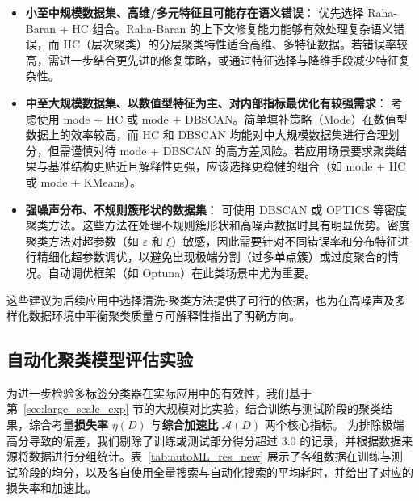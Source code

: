 \documentclass[10pt]{article} %
\numberwithin{equation}{section}
\begin{document}
\begin{itemize}
    \item \textbf{小至中规模数据集、高维/多元特征且可能存在语义错误}：
    优先选择 Raha-Baran + HC 组合。Raha-Baran 的上下文修复能力能够有效处理复杂语义错误，而 HC（层次聚类）的分层聚类特性适合高维、多特征数据。若错误率较高，需进一步结合更先进的修复策略，或通过特征选择与降维手段减少特征复杂性。

    \item \textbf{中至大规模数据集、以数值型特征为主、对内部指标最优化有较强需求}：
    考虑使用 mode + HC 或 mode + DBSCAN。简单填补策略（Mode）在数值型数据上的效率较高，而 HC 和 DBSCAN 均能对中大规模数据集进行合理划分，但需谨慎对待 mode + DBSCAN 的高方差风险。若应用场景要求聚类结果与基准结构更贴近且解释性更强，应该选择更稳健的组合（如 mode + HC 或 mode + KMeans）。

    \item \textbf{强噪声分布、不规则簇形状的数据集}：
    可使用 DBSCAN 或 OPTICS 等密度聚类方法。这些方法在处理不规则簇形状和高噪声数据时具有明显优势。密度聚类方法对超参数（如 $\varepsilon$ 和 $\xi$）敏感，因此需要针对不同错误率和分布特征进行精细化超参数调优，以避免出现极端分割（过多单点簇）或过度聚合的情况。自动调优框架（如 Optuna）在此类场景中尤为重要。
\end{itemize}

这些建议为后续应用中选择清洗-聚类方法提供了可行的依据，也为在高噪声及多样化数据环境中平衡聚类质量与可解释性指出了明确方向。

\subsection{自动化聚类模型评估实验}
\label{sec:automl_exp}

为进一步检验多标签分类器在实际应用中的有效性，我们基于第~\ref{sec:large_scale_exp} 节的大规模对比实验，结合训练与测试阶段的聚类结果，综合考量\textbf{损失率} \(\eta(D)\) 与\textbf{综合加速比} \(\mathcal{A}(D)\) 两个核心指标。
为排除极端高分导致的偏差，我们剔除了训练或测试部分得分超过 3.0 的记录，并根据数据来源将数据进行分组统计。表~\ref{tab:autoML_res_new} 展示了各组数据在训练与测试阶段的均分，以及各自使用全量搜索与自动化搜索的平均耗时，并给出了对应的损失率和加速比。
\end{document}

